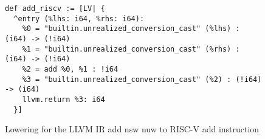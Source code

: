 \begin{figure}
\begin{minipage}{\textwidth}
\begin{lstlisting}
def add_riscv := [LV| {
  ^entry (%lhs: i64, %rhs: i64):
    %0 = "builtin.unrealized_conversion_cast" (%lhs) : (i64) -> (!i64)
    %1 = "builtin.unrealized_conversion_cast" (%rhs) : (i64) -> (!i64)
    %2 = add %0, %1 : !i64
    %3 = "builtin.unrealized_conversion_cast" (%2) : (!i64) -> (i64)
    llvm.return %3: i64
  }]
\end{lstlisting}
\end{minipage}
\caption{Lowering for the LLVM IR add nsw nuw to RISC-V add instruction}
\label{fig:LLVMIR-SEMANTICS-SHL}
\end{figure}

